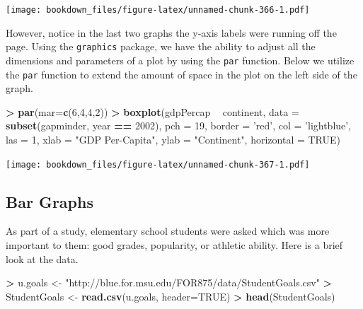 \documentclass[]{krantz}
\makeatletter
\newenvironment{Shaded}{\begin{snugshade}}{\end{snugshade}}
\newcommand{\KeywordTok}[1]{\textcolor[rgb]{0.27,0.27,0.27}{\textbf{#1}}}
\newcommand{\DataTypeTok}[1]{\textcolor[rgb]{0.27,0.27,0.27}{#1}}
\newcommand{\DecValTok}[1]{\textcolor[rgb]{0.06,0.06,0.06}{#1}}
\newcommand{\StringTok}[1]{\textcolor[rgb]{0.5,0.5,0.5}{#1}}
\newcommand{\OtherTok}[1]{\textcolor[rgb]{0.37,0.37,0.37}{#1}}
\newcommand{\OperatorTok}[1]{\textcolor[rgb]{0.43,0.43,0.43}{\textbf{#1}}}
\newcommand{\NormalTok}[1]{#1}
\newenvironment{kframe}{%
\medskip{}
\setlength{\fboxsep}{.8em}
 \def\at@end@of@kframe{}%
 \ifinner\ifhmode%
  \def\at@end@of@kframe{\end{minipage}}%
  \begin{minipage}{\columnwidth}%
 \fi\fi%
 \def\FrameCommand##1{\hskip\@totalleftmargin \hskip-\fboxsep
 \colorbox{shadecolor}{##1}\hskip-\fboxsep
     \hskip-\linewidth \hskip-\@totalleftmargin \hskip\columnwidth}%
 \MakeFramed {\advance\hsize-\width
   \@totalleftmargin\z@ \linewidth\hsize
   \@setminipage}}%
 {\par\unskip\endMakeFramed%
 \at@end@of@kframe}
\renewenvironment{Shaded}{\begin{kframe}}{\end{kframe}}
\makeatother
\begin{document}
\texttt{[image: bookdown\_files/figure-latex/unnamed-chunk-366-1.pdf]}

However, notice in the last two graphs the y-axis labels were running
off the page. Using the \texttt{graphics} package, we have the ability
to adjust all the dimensions and parameters of a plot by using the
\texttt{par} function. Below we utilize the \texttt{par} function to
extend the amount of space in the plot on the left side of the graph.

\begin{Shaded}
\begin{Highlighting}[]
\OperatorTok{>}\StringTok{ }\KeywordTok{par}\NormalTok{(}\DataTypeTok{mar=}\KeywordTok{c}\NormalTok{(}\DecValTok{6}\NormalTok{,}\DecValTok{4}\NormalTok{,}\DecValTok{4}\NormalTok{,}\DecValTok{2}\NormalTok{))}
\OperatorTok{>}\StringTok{ }\KeywordTok{boxplot}\NormalTok{(gdpPercap }\OperatorTok{~}\StringTok{ }\NormalTok{continent, }\DataTypeTok{data =} \KeywordTok{subset}\NormalTok{(gapminder, year }\OperatorTok{==}\StringTok{ }\DecValTok{2002}\NormalTok{), }\DataTypeTok{pch =} \DecValTok{19}\NormalTok{, }\DataTypeTok{border =} \StringTok{'red'}\NormalTok{, }\DataTypeTok{col =} \StringTok{'lightblue'}\NormalTok{, }\DataTypeTok{las =} \DecValTok{1}\NormalTok{, }\DataTypeTok{xlab =} \StringTok{"GDP Per-Capita"}\NormalTok{, }\DataTypeTok{ylab =} \StringTok{"Continent"}\NormalTok{, }\DataTypeTok{horizontal =} \OtherTok{TRUE}\NormalTok{)}
\end{Highlighting}
\end{Shaded}

\texttt{[image: bookdown\_files/figure-latex/unnamed-chunk-367-1.pdf]}

\subsection{Bar Graphs}\label{bar-graphs-1}

As part of a study, elementary school students were asked which was more
important to them: good grades, popularity, or athletic ability. Here is
a brief look at the data.

\begin{Shaded}
\begin{Highlighting}[]
\OperatorTok{>}\StringTok{ }\NormalTok{u.goals <-}\StringTok{ "http://blue.for.msu.edu/FOR875/data/StudentGoals.csv"}
\OperatorTok{>}\StringTok{ }\NormalTok{StudentGoals <-}\StringTok{ }\KeywordTok{read.csv}\NormalTok{(u.goals, }\DataTypeTok{header=}\OtherTok{TRUE}\NormalTok{)}
\OperatorTok{>}\StringTok{ }\KeywordTok{head}\NormalTok{(StudentGoals)}
\end{Highlighting}
\end{Shaded}
\end{document}
